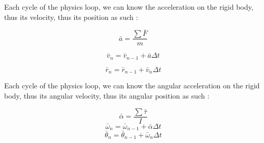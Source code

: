 \documentclass[12pt]{article}
\begin{document}
Each cycle of the physics loop, we can know the acceleration on the rigid body, thus its velocity, thus its position as such :

$$ \bar{a} = \frac{\sum \bar{F}}{m} $$

$$ \bar{v}_n = \bar{v}_{n - 1} + \bar{a} \Delta t $$

$$ \bar{r}_n = \bar{r}_{n - 1} + \bar{v}_n \Delta t $$

Each cycle of the physics loop, we can know the angular acceleration on the rigid body, thus its angular velocity, thus its angular position as such :


$$ \bar{\alpha} = \frac{\sum \bar{\tau}}{I} $$
$$ \bar{\omega}_n = \bar{\omega}_{n-1} + \bar{\alpha} \Delta t $$
$$ \bar{\theta}_n = \bar{\theta}_{n-1} + \bar{\omega}_n \Delta t $$
\end{document}
